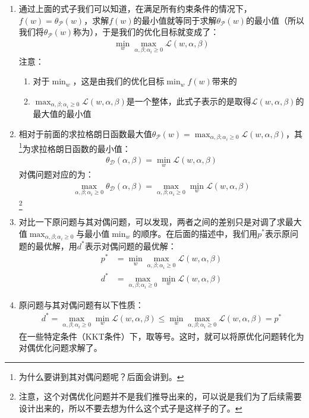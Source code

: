 \begin{enumerate}
	\item 通过上面的式子我们可以知道，在满足所有约束条件的情况下，$f(w)=\theta_{\mathcal{P}}(w)$，求解$f(w)$的最小值就等同于求解$\theta_{\mathcal{P}}(w)$的最小值（所以我们将$\theta_{\mathcal{P}}(w)$称为{\color{blue}{原问题}}），于是我们的优化目标就变成了：
	\begin{align}
		\min_{w} \max_{\alpha, \beta; \alpha_i \geq 0} \mathcal{L}(w, \alpha, \beta)
	\end{align}
	注意：
	\begin{enumerate}
		\item 对于$\min_{w}$，这是由我们的优化目标$\min_{w}f(w)$带来的
		\item $\max_{\alpha, \beta; \alpha_i \geq 0} \mathcal{L}(w, \alpha, \beta)$是一个整体，此式子表示的是取得$\mathcal{L}(w, \alpha, \beta)$的最大值的最小值
	\end{enumerate}

	\item 相对于前面的求拉格朗日函数最大值$\theta_{\mathcal{P}}(w) = \max_{\alpha, \beta; \alpha_i\geq0} \mathcal{L}(w, \alpha, \beta)$，其{\color{blue}{对偶问题}}\footnote{为什么要讲到其对偶问题呢？后面会讲到。}为求拉格朗日函数的最小值：
	\begin{align}
		\theta_{\mathcal{D}}(\alpha, \beta) = \min_{w} \mathcal{L}(w, \alpha, \beta)
	\end{align}
	对偶问题对应的{\color{blue}{对偶优化问题}}为：
	\begin{align}
		\max_{\alpha, \beta;\alpha_i \geq 0} \theta_{\mathcal{D}}(\alpha, \beta) = \max_{\alpha, \beta;\alpha_i \geq 0} \min_{w} \mathcal{L}(w, \alpha, \beta)
	\end{align}
	\footnote{注意，这个对偶优化问题并不是我们推导出来的，可以说是我们为了后续需要设计出来的，所以不要去想为什么这个式子是这样子的了。}

	\item 对比一下原问题与其对偶问题，可以发现，两者之间的差别只是对调了求最大值$\max_{\alpha, \beta;\alpha_i \geq 0}$与最小值$\min_{w}$的顺序。在后面的描述中，我们用$p^{*}$表示原问题的最优解，用$d^{*}$表示对偶问题的最优解：
	\begin{align}
		p^{*} &= \min_{w} \max_{\alpha, \beta; \alpha_i \geq 0} \mathcal{L}(w, \alpha, \beta) \\
		d^{*} &= \max_{\alpha, \beta;\alpha_i \geq 0} \min_{w} \mathcal{L}(w, \alpha, \beta)
	\end{align}

	\item 原问题与其对偶问题有以下性质：
	\begin{align}
		d^{*} = \max_{\alpha, \beta;\alpha_i \geq 0} \min_{w} \mathcal{L}(w, \alpha, \beta) \leq 
		\min_{w} \max_{\alpha, \beta; \alpha_i \geq 0} \mathcal{L}(w, \alpha, \beta) = p^{*}
	\end{align}
	在一些特定条件（KKT条件）下，取等号。这时，就可以将原优化问题转化为对偶优化问题求解了。


\end{enumerate}
